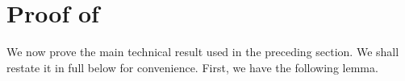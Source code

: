 
\section{Proof of }

We now prove the main technical result used in the preceding section. We shall restate it in full below for convenience. First, we have the following lemma.
